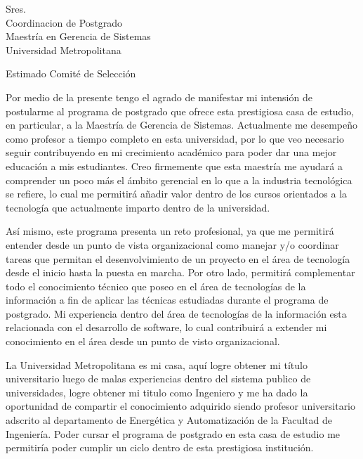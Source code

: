 \documentclass[12pt, a4paper]{letter} %
\begin{document}

\begin{letter}{
	Sres.\\
	Coordinacion de Postgrado \\
	Maestría en Gerencia de Sistemas\\
	Universidad Metropolitana
}


\opening{Estimado Comité de Selección}

	Por medio de la presente tengo el agrado de manifestar mi intensión de postularme al programa de postgrado que ofrece esta prestigiosa casa de estudio, en particular, a la Maestría de Gerencia de Sistemas. Actualmente me desempeño como profesor a tiempo completo en esta universidad, por lo que veo necesario seguir contribuyendo en mi crecimiento académico para poder dar una mejor educación a mis estudiantes. Creo firmemente que esta maestría me ayudará a comprender un poco más el ámbito gerencial en lo que a la industria tecnológica se refiere, lo cual me permitirá añadir valor dentro de los cursos orientados a la tecnología que actualmente imparto dentro de la universidad.
	
	Así mismo, este programa presenta un reto profesional, ya que me permitirá entender desde un punto de vista organizacional como manejar y/o coordinar tareas que permitan el desenvolvimiento de un proyecto en el área de tecnología desde el inicio hasta la puesta en marcha. Por otro lado, permitirá complementar todo el conocimiento técnico que poseo en el área de tecnologías de la información a fin de aplicar las técnicas estudiadas durante el programa de postgrado. Mi experiencia dentro del área de tecnologías de la información esta relacionada con el desarrollo de software, lo cual contribuirá a extender mi conocimiento en el área desde un punto de visto organizacional.
	
	La Universidad Metropolitana es mi casa, aquí logre obtener mi título universitario luego de malas experiencias dentro del sistema publico de universidades, logre obtener mi titulo como Ingeniero y me ha dado la oportunidad de compartir el conocimiento adquirido siendo profesor universitario adscrito al departamento de Energética y Automatización de la Facultad de Ingeniería. Poder cursar el programa de postgrado en esta casa de estudio me permitiría poder cumplir un ciclo dentro de esta prestigiosa institución.
	

\end{letter}
\end{document}
